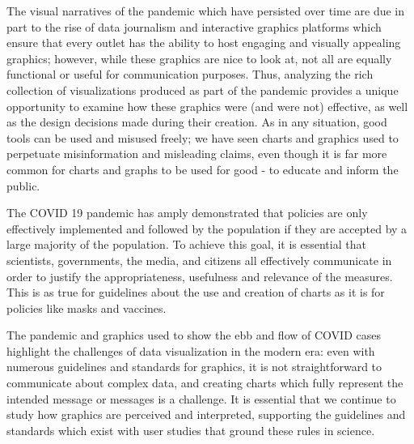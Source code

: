 \documentclass[article]{jdssv}\usepackage[]{graphicx}\usepackage[]{xcolor}
\begin{document}
The visual narratives of the pandemic which have persisted over time are due in part to the rise of data journalism and interactive graphics platforms which ensure that every outlet has the ability to host engaging and visually appealing graphics; however, while these graphics are nice to look at, not all are equally functional or useful for communication purposes. Thus, analyzing the rich collection of visualizations produced as part of the pandemic provides a unique opportunity to examine how these graphics were (and were not) effective, as well as the design decisions made during their creation. As in any situation, good tools can be used and misused freely; we have seen charts and graphics used to perpetuate misinformation and misleading claims, even though it is far more common for charts and graphs to be used for good - to educate and inform the public.

The COVID 19 pandemic has amply demonstrated that policies are only effectively implemented and followed by the population if they are accepted by a large majority of the population. To achieve this goal, it is essential that scientists, governments, the media, and citizens all effectively communicate in order to justify the appropriateness, usefulness and relevance of the measures. This is as true for guidelines about the use and creation of charts as it is for policies like masks and vaccines. %

The pandemic and graphics used to show the ebb and flow of COVID cases highlight the challenges of data visualization in the modern era: even with numerous guidelines and standards for graphics, it is not straightforward to communicate about complex data, and creating charts which fully represent the intended message or messages is a challenge. It is essential that we continue to study how graphics are perceived and interpreted, supporting the guidelines and standards which exist with user studies that ground these rules in science. 

\end{document}
